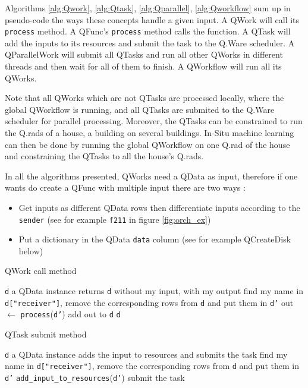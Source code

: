 \documentclass[10pt, conference, compsocconf]{IEEEtran}
\begin{document}
Algorithms \ref{alg:Qwork}, \ref{alg:Qtask}, \ref{alg:Qparallel}, \ref{alg:Qworkflow} sum up in pseudo-code the ways these concepts handle a given input. A QWork will call its \texttt{process} method. A QFunc's \texttt{process} method calls the function. A QTask will add the inputs to its resources and submit the task to the Q.Ware scheduler. A QParallelWork will submit all QTasks and run all other QWorks in different threads and then wait for all of them to finish. A QWorkflow will run all its QWorks.

Note that all QWorks which are not QTasks are processed locally, where the global QWorkflow is running, and all QTasks are submited to the Q.Ware scheduler for parallel processing. Moreover, the QTasks can be constrained to run the Q.rads of a house, a building on several buildings. In-Situ machine learning can then be done by running the global QWorkflow on one Q.rad of the house and constraining the QTasks to all the house's Q.rads.

In all the algorithms presented, QWorks need a QData as input, therefore if one wants do create a QFunc with multiple input there are two ways :
\begin{itemize}
\item Get inputs as different QData rows then differentiate inputs according to the \texttt{sender} (see for example \texttt{f211} in figure \ref{fig:orch_ex})
\item Put a dictionary in the QData \texttt{data} column (see for example QCreateDisk below)
\end{itemize}

\begin{algorithm}[H]
\caption{QWork call method}
\label{alg:Qwork}
\begin{algorithmic}
\REQUIRE \texttt{d} a QData instance
\ENSURE returns \texttt{d} without my input, with my output
\STATE find my name in \texttt{d["receiver"]}, remove the corresponding rows from \texttt{d} and put them in \texttt{d'}
\STATE out $\leftarrow$ \texttt{process}(\texttt{d'})
\STATE add out to \texttt{d}
\RETURN \texttt{d}
\end{algorithmic}
\end{algorithm}

\begin{algorithm}[H]
\caption{QTask submit method}
\label{alg:Qtask}
\begin{algorithmic}
\REQUIRE \texttt{d} a QData instance
\ENSURE adds the input to resources and submits the task
\STATE find my name in \texttt{d["receiver"]}, remove the corresponding rows from \texttt{d} and put them in \texttt{d'}
\STATE \texttt{add\_input\_to\_resources}(\texttt{d'})
\STATE submit the task
\end{algorithmic}
\end{algorithm}
\end{document}
